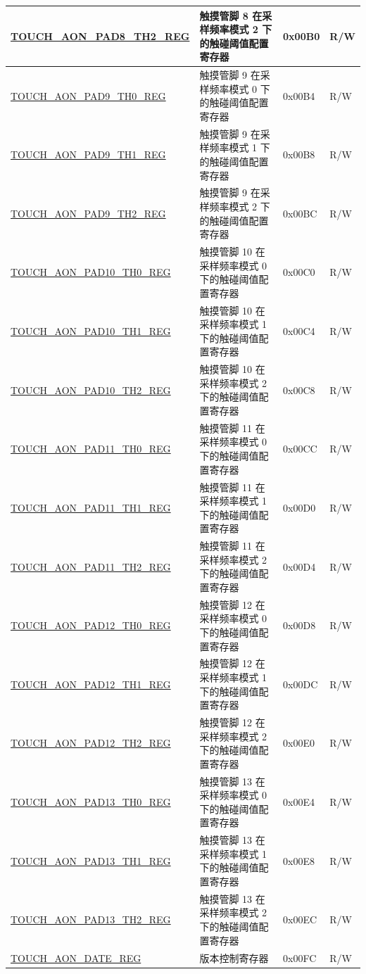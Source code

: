 \begin{longtable}{ | p{8cm} | p{10cm} | p{1.3cm} | p{1cm} | }
\hyperref[regdesc:TOUCHAONPADNTH2REG]{TOUCH\_AON\_PAD8\_TH2\_REG} & 触摸管脚 8 在采样频率模式 2 下的触碰阈值配置寄存器 & 0x00B0 & R/W \\ \hline
\hyperref[regdesc:TOUCHAONPADNTH0REG]{TOUCH\_AON\_PAD9\_TH0\_REG} & 触摸管脚 9 在采样频率模式 0 下的触碰阈值配置寄存器 & 0x00B4 & R/W \\ \hline
\hyperref[regdesc:TOUCHAONPADNTH1REG]{TOUCH\_AON\_PAD9\_TH1\_REG} & 触摸管脚 9 在采样频率模式 1 下的触碰阈值配置寄存器 & 0x00B8 & R/W \\ \hline
\hyperref[regdesc:TOUCHAONPADNTH2REG]{TOUCH\_AON\_PAD9\_TH2\_REG} & 触摸管脚 9 在采样频率模式 2 下的触碰阈值配置寄存器 & 0x00BC & R/W \\ \hline
\hyperref[regdesc:TOUCHAONPADNTH0REG]{TOUCH\_AON\_PAD10\_TH0\_REG} & 触摸管脚 10 在采样频率模式 0 下的触碰阈值配置寄存器 & 0x00C0 & R/W \\ \hline
\hyperref[regdesc:TOUCHAONPADNTH1REG]{TOUCH\_AON\_PAD10\_TH1\_REG} & 触摸管脚 10 在采样频率模式 1 下的触碰阈值配置寄存器 & 0x00C4 & R/W \\ \hline
\hyperref[regdesc:TOUCHAONPADNTH2REG]{TOUCH\_AON\_PAD10\_TH2\_REG} & 触摸管脚 10 在采样频率模式 2 下的触碰阈值配置寄存器 & 0x00C8 & R/W \\ \hline
\hyperref[regdesc:TOUCHAONPADNTH0REG]{TOUCH\_AON\_PAD11\_TH0\_REG} & 触摸管脚 11 在采样频率模式 0 下的触碰阈值配置寄存器 & 0x00CC & R/W \\ \hline
\hyperref[regdesc:TOUCHAONPADNTH1REG]{TOUCH\_AON\_PAD11\_TH1\_REG} & 触摸管脚 11 在采样频率模式 1 下的触碰阈值配置寄存器 & 0x00D0 & R/W \\ \hline
\hyperref[regdesc:TOUCHAONPADNTH2REG]{TOUCH\_AON\_PAD11\_TH2\_REG} & 触摸管脚 11 在采样频率模式 2 下的触碰阈值配置寄存器 & 0x00D4 & R/W \\ \hline
\hyperref[regdesc:TOUCHAONPADNTH0REG]{TOUCH\_AON\_PAD12\_TH0\_REG} & 触摸管脚 12 在采样频率模式 0 下的触碰阈值配置寄存器 & 0x00D8 & R/W \\ \hline
\hyperref[regdesc:TOUCHAONPADNTH1REG]{TOUCH\_AON\_PAD12\_TH1\_REG} & 触摸管脚 12 在采样频率模式 1 下的触碰阈值配置寄存器 & 0x00DC & R/W \\ \hline
\hyperref[regdesc:TOUCHAONPADNTH2REG]{TOUCH\_AON\_PAD12\_TH2\_REG} & 触摸管脚 12 在采样频率模式 2 下的触碰阈值配置寄存器 & 0x00E0 & R/W \\ \hline
\hyperref[regdesc:TOUCHAONPADNTH0REG]{TOUCH\_AON\_PAD13\_TH0\_REG} & 触摸管脚 13 在采样频率模式 0 下的触碰阈值配置寄存器 & 0x00E4 & R/W \\ \hline
\hyperref[regdesc:TOUCHAONPADNTH1REG]{TOUCH\_AON\_PAD13\_TH1\_REG} & 触摸管脚 13 在采样频率模式 1 下的触碰阈值配置寄存器 & 0x00E8 & R/W \\ \hline
\hyperref[regdesc:TOUCHAONPADNTH2REG]{TOUCH\_AON\_PAD13\_TH2\_REG} & 触摸管脚 13 在采样频率模式 2 下的触碰阈值配置寄存器 & 0x00EC & R/W \\ \hline
\hyperref[regdesc:TOUCHAONDATEREG]{TOUCH\_AON\_DATE\_REG} & 版本控制寄存器 & 0x00FC & R/W \\ \hline
\end{longtable}
